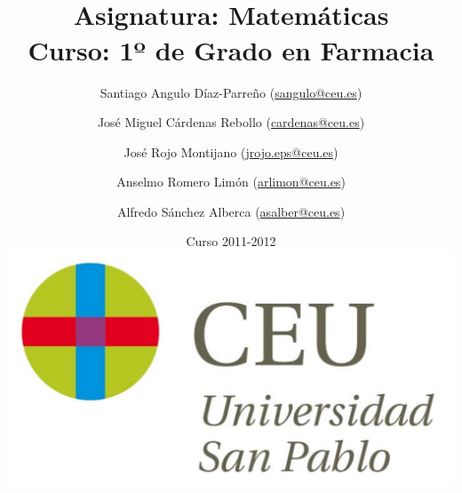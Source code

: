 \documentclass[a4paper,dvips,titlepage]{article}
\begin{document}
\sloppy

\title{\vskip 2cm
\shadowbox{\Huge \textbf{\textsf{\quad \textcolor[rgb]{0.00,0.00,0.50}{EJERCICIOS DE ESTADÍSTICA}\quad}}}\\
   \vskip 1cm
   {\Large \textsf{\textcolor[rgb]{0.50,0.00,0.25}{Asignatura: Matemáticas }}}\\
   {\Large \textsf{\textcolor[rgb]{0.50,0.00,0.25}{Curso: 1º de Grado en Farmacia}}}
   }
\author{
   Santiago Angulo Díaz-Parreño (\url{sangulo@ceu.es})
   \and
   José Miguel Cárdenas Rebollo (\url{cardenas@ceu.es})
   \and
   José Rojo Montijano (\url{jrojo.eps@ceu.es})
   \and
   Anselmo Romero Limón (\url{arlimon@ceu.es})
   \and
   Alfredo Sánchez Alberca (\url{asalber@ceu.es})
}
\date{Curso 2011-2012\\[1cm]
\includegraphics[scale=0.3]{img/logo_uspceu_01}}

\maketitle
\newpage
\tableofcontents
\newpage







\end{document}
